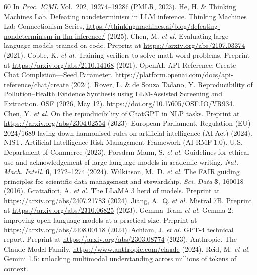 \documentclass[sn-nature]{sn-jnl}
\begin{document}
\begin{thebibliography}{60}
In \emph{Proc. ICML} Vol.~202, 19274--19286 (PMLR, 2023).
He, H. \& Thinking Machines Lab.
Defeating nondeterminism in LLM inference.
Thinking Machines Lab Connectionism Series, \url{https://thinkingmachines.ai/blog/defeating-nondeterminism-in-llm-inference/} (2025).
Chen, M. \emph{et al.}
Evaluating large language models trained on code.
Preprint at \url{https://arxiv.org/abs/2107.03374} (2021).
Cobbe, K. \emph{et al.}
Training verifiers to solve math word problems.
Preprint at \url{https://arxiv.org/abs/2110.14168} (2021).
OpenAI. API Reference: Create Chat Completion---Seed Parameter.
\url{https://platform.openai.com/docs/api-reference/chat/create} (2024).
Rover, L. \& de Souza Tadano, Y.
Reproducibility of Pollution--Health Evidence Synthesis using LLM-Assisted Screening and Extraction.
OSF (2026, May 12). \url{https://doi.org/10.17605/OSF.IO/VR934}.
Chen, Y. \emph{et al.}
On the reproducibility of ChatGPT in NLP tasks.
Preprint at \url{https://arxiv.org/abs/2304.02554} (2023).
European Parliament.
Regulation (EU) 2024/1689 laying down harmonised rules on artificial intelligence (AI Act) (2024).
NIST.
Artificial Intelligence Risk Management Framework (AI RMF 1.0).
U.S. Department of Commerce (2023).
Porsdam Mann, S. \emph{et al.}
Guidelines for ethical use and acknowledgement of large language models in academic writing.
\emph{Nat. Mach. Intell.} \textbf{6}, 1272--1274 (2024).
Wilkinson, M.~D. \emph{et al.}
The FAIR guiding principles for scientific data management and stewardship.
\emph{Sci. Data} \textbf{3}, 160018 (2016).
Grattafiori, A. \emph{et al.}
The LLaMA 3 herd of models.
Preprint at \url{https://arxiv.org/abs/2407.21783} (2024).
Jiang, A.~Q. \emph{et al.}
Mistral 7B.
Preprint at \url{https://arxiv.org/abs/2310.06825} (2023).
Gemma Team \emph{et al.}
Gemma 2: improving open language models at a practical size.
Preprint at \url{https://arxiv.org/abs/2408.00118} (2024).
Achiam, J. \emph{et al.}
GPT-4 technical report.
Preprint at \url{https://arxiv.org/abs/2303.08774} (2023).
Anthropic.
The Claude Model Family.
\url{https://www.anthropic.com/claude} (2024).
Reid, M. \emph{et al.}
Gemini 1.5: unlocking multimodal understanding across millions of tokens of context.

\end{thebibliography}
\end{document}
